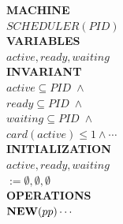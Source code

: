 \begin{slide}

\begin{center}
\setlength{\columnsep}{-20ex}
\begin{multicols}{2} \raggedright
{}
\begin{algo}
\>      {\bf MACHINE} \\
\>      \>      $SCHEDULER(PID)$  \\
\>      {\bf VARIABLES} \\
\>      \>      $active,ready,waiting$  \\
\>      {\bf INVARIANT} \\
\>      \>      $active \subseteq PID \; \wedge$ \\
\>      \>      $ready \subseteq PID  \; \wedge$ \\
\>      \>      $waiting \subseteq PID \; \wedge$ \\
\>      \>      $card(active) \leq 1 \wedge \cdots$ \\
\>      {\bf INITIALIZATION} \\
\>      \>      $active,ready,waiting$\\
\>      \>      \qquad $:=\emptyset,\emptyset,\emptyset$\\
\>      {\bf OPERATIONS} \\
\>      \>      ${\bf NEW}(pp) \cdots$  \\


\end{algo}
\end{multicols}
\end{center}
\end{slide}
